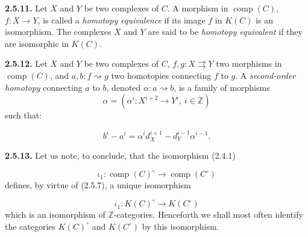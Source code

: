 %
\noindent\textbf{2.5.11.}\quad
{}
Let $X$ and $Y$ be two complexes of $C$. A morphism in
$\operatorname{comp}(C)$, $f\colon X\longrightarrow Y$, is called a
\emph{homotopy equivalence} if its image $\dot f$ in $K(C)$ is an
isomorphism.
The complexes $X$ and $Y$ are said to be \emph{homotopy equivalent} if they
are isomorphic in $K(C)$.

\noindent\textbf{2.5.12.}\quad
{}
Let $X$ and $Y$ be two complexes of $C$,
$f,g\colon X\rightrightarrows Y$ two morphisms in
$\operatorname{comp}(C)$, and
$a,b\colon f\rightsquigarrow g$ two homotopies connecting $f$ to $g$.
A \emph{second-order homotopy} connecting $a$ to $b$, denoted
$\alpha\colon a\rightsquigarrow b$, is a family of morphisms
\[
  \alpha=(\alpha^i\colon X^{i+2}\longrightarrow Y^i,\ i\in\mathbb Z)
\]
such that:

\begin{equation}
  b^i-a^i
  =\alpha^i d_X^{i+1}-d_Y^{i-1}\alpha^{i-1}.
  \tag{2.5.12.1}
\end{equation}

\noindent\textbf{2.5.13.}\quad
Let us note, to conclude, that the isomorphism (2.4.1)

\begin{equation*}
  \iota_1\colon
  \operatorname{comp}(C)^\circ
  \longrightarrow
  \operatorname{comp}(C^\circ)
\end{equation*}
defines, by virtue of (2.5.7), a unique isomorphism

\begin{equation*}
  \iota_1\colon
  K(C)^\circ
  \longrightarrow
  K(C^\circ)
\end{equation*}
which is an isomorphism of $\mathbb Z$-categories.
Henceforth we shall most often identify the categories $K(C)^\circ$ and
$K(C^\circ)$ by this isomorphism.
